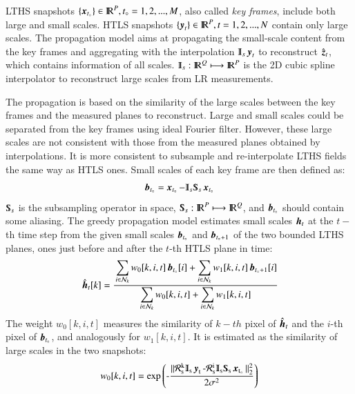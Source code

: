 LTHS snapshots $ \{\operatorname{\boldsymbol{x}}_{t_{\circ}} \} \in {\rm I\!R}^{P}, t_{\circ} = 1,2,...,M$, also called \textit{key frames}, include both large and small scales. HTLS snapshots $ \{\operatorname{\boldsymbol{y}}_t \}  \in {\rm I\!R}^{P}, t=1,2,...,N$ contain only large scales. The propagation model aims at propagating the small-scale content from the key frames and aggregating with the interpolation $ \Interp_s\y_t $ to reconstruct $  \operatorname{\hat{\operatorname{\boldsymbol{z}}}}_t $, which contains information of all scales. $ \Interp_s: \R^{\dimsl} \mymapto \R^{\dimsh} $ is the 2D cubic spline interpolator to reconstruct large scales from LR measurements. 

The propagation is based on the similarity of the large scales between the key frames and the measured planes to reconstruct. Large and small scales could be separated from the key frames using ideal Fourier filter. However, these large scales are not consistent with those from the measured planes obtained by interpolations. It is more consistent to subsample and re-interpolate LTHS fields the same way as HTLS ones. Small scales of each key frame are then defined as:
\begin{equation}
\boundHF_{t_\knot} = \mybold{x}_{t_\knot} - \Interp_s\Sub_s\mybold{x}_{t_\knot}
\label{eq:greddy1}
\end{equation}
$ \Sub_s $ is the subsampling operator in space, $ \Sub_s: \R^{\dimsh} \mymapto \R^{\dimsl} $, and $ \operatorname{\boldsymbol{b}}_{t_{\circ}} $ should contain some aliasing. The greedy propagation model estimates small scales $ \operatorname{\boldsymbol{h}}_t $ at the $ t- $th time step from the given small scales  $ \operatorname{\boldsymbol{b}}_{t_{\circ}} $ and $ \operatorname{\boldsymbol{b}}_{t_{\circ}+1} $ of the two bounded LTHS planes, ones just before and after the $ t $-th HTLS plane in time:
\begin{equation}
	\hat{\operatorname{\boldsymbol{h}}}_t[k]=\cfrac{\displaystyle \sum_{i\in\mathcal{N}_k}w_0[k,i,t]\operatorname{\boldsymbol{b}}_{t_{\circ}}[i] + \sum_{i\in\mathcal{N}_k}w_1[k,i,t]\operatorname{\boldsymbol{b}}_{t_{\circ}+1}[i]}{\displaystyle\sum_{i\in\mathcal{N}_k}w_0[k,i,t] + \sum_{i\in\mathcal{N}_k}w_1[k,i,t]}
\label{eq:greddy2}
\end{equation}
The weight $ w_0[k,i,t] $ measures the similarity of $ k-th $ pixel of $ \hat{\operatorname{\boldsymbol{h}}}_t $ and the $ i $-th pixel of $ \operatorname{\boldsymbol{b}}_{t_{\circ}} $, and analogously for $ w_1[k,i,t] $. It is estimated as the similarity of large scales in the two snapshots:
\begin{equation}
w_0[k,i,t] = \myexp{ -\frac{\|\mathcal{R}_s^k\Interp_s\mybold{y}_t-\mathcal{R}_s^i\Interp_s\Sub_s\mybold{x}_{t_\knot} \|^2_2}{2\nlmfilparam^2}}
\label{eq:greddy3}
\end{equation}
